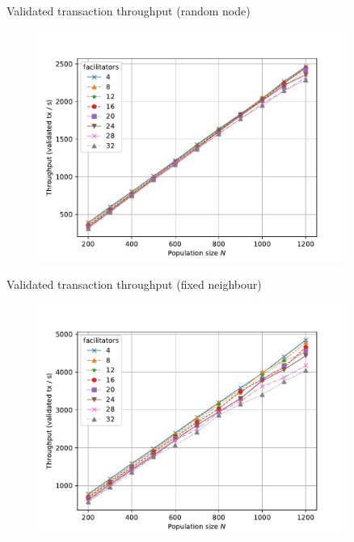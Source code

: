 \documentclass{beamer}
\begin{document}
\begin{frame}{Validated transaction throughput (random node)}
  \begin{figure}[h]
  \includegraphics[width=0.9\textwidth]{neighbour-random/throughput-vs-population}
  \centering
  \end{figure}
\end{frame}

\begin{frame}{Validated transaction throughput (fixed neighbour)}
  \begin{figure}[h]
  \includegraphics[width=0.9\textwidth]{neighbour-fixed/throughput-vs-population}
  \centering
  \end{figure}
\end{frame}
\end{document}
